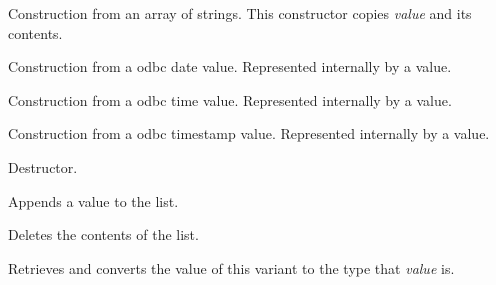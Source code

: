 Construction from an array of strings.  This constructor copies {\it value} and its contents.


Construction from a odbc date value.  Represented internally by a  value.


Construction from a odbc time value.  Represented internally by a  value.


Construction from a odbc timestamp value.  Represented internally by a  value.

\label{wxvariantdtor}


Destructor.


\label{wxvariantappend}


Appends a value to the list.

\label{wxvariantclearlist}


Deletes the contents of the list.


\label{wxvariantconvert}







Retrieves and converts the value of this variant to the type that {\it value} is.


\label{wxvariantgetcount}


